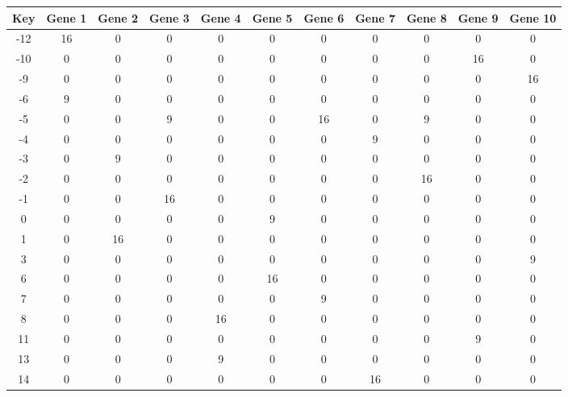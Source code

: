 \begin{tabular}{|c|c|c|c|c|c|c|c|c|c|c|}
\hline
Key & Gene 1 & Gene 2 & Gene 3 & Gene 4 & Gene 5 & Gene 6 & Gene 7 & Gene 8 & Gene 9 & Gene 10 \\
\hline
-12 & 16 & 0 & 0 & 0 & 0 & 0 & 0 & 0 & 0 & 0 \\
-10 & 0 & 0 & 0 & 0 & 0 & 0 & 0 & 0 & 16 & 0 \\
-9 & 0 & 0 & 0 & 0 & 0 & 0 & 0 & 0 & 0 & 16 \\
-6 & 9 & 0 & 0 & 0 & 0 & 0 & 0 & 0 & 0 & 0 \\
-5 & 0 & 0 & 9 & 0 & 0 & 16 & 0 & 9 & 0 & 0 \\
-4 & 0 & 0 & 0 & 0 & 0 & 0 & 9 & 0 & 0 & 0 \\
-3 & 0 & 9 & 0 & 0 & 0 & 0 & 0 & 0 & 0 & 0 \\
-2 & 0 & 0 & 0 & 0 & 0 & 0 & 0 & 16 & 0 & 0 \\
-1 & 0 & 0 & 16 & 0 & 0 & 0 & 0 & 0 & 0 & 0 \\
0 & 0 & 0 & 0 & 0 & 9 & 0 & 0 & 0 & 0 & 0 \\
1 & 0 & 16 & 0 & 0 & 0 & 0 & 0 & 0 & 0 & 0 \\
3 & 0 & 0 & 0 & 0 & 0 & 0 & 0 & 0 & 0 & 9 \\
6 & 0 & 0 & 0 & 0 & 16 & 0 & 0 & 0 & 0 & 0 \\
7 & 0 & 0 & 0 & 0 & 0 & 9 & 0 & 0 & 0 & 0 \\
8 & 0 & 0 & 0 & 16 & 0 & 0 & 0 & 0 & 0 & 0 \\
11 & 0 & 0 & 0 & 0 & 0 & 0 & 0 & 0 & 9 & 0 \\
13 & 0 & 0 & 0 & 9 & 0 & 0 & 0 & 0 & 0 & 0 \\
14 & 0 & 0 & 0 & 0 & 0 & 0 & 16 & 0 & 0 & 0 \\
\hline
\end{tabular}